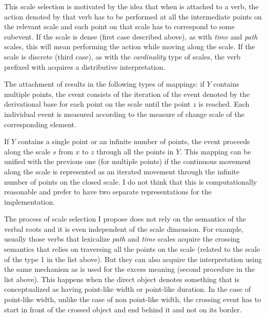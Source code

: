 
This scale selection is motivated by the idea that when  is attached to a verb, the action denoted by that verb has to be performed at all the intermediate points on the relevant scale and each point on that scale has to correspond to some subevent. If the scale is dense (first case described above), as with \textit{time} and \textit{path} scales, this will mean performing the action while moving along the scale. If the scale is discrete (third case), as with the \textit{cardinality} type of scales, the verb prefixed with  acquires a distributive interpretation. 

The attachment of  results in the following types of mappings: %
if $Y$ contains multiple points, the event consists of the iteration of the event denoted by the derivational base for each point on the scale until the point $z$ is reached. Each individual event is measured according to the measure of change scale of the corresponding element.

If $Y$ contains a single point or an infinite number of points, the event proceeds along the scale $s$ from $x$ to $z$ through all the points in $Y$. This mapping can be unified with the previous one (for multiple points) if the continuous movement along the scale is represented as an iterated movement through the infinite number of points on the closed scale. I do not think that this is computationally reasonable and prefer to have two separate representations for the implementation.

The process of scale selection I propose does not rely on the semantics of the verbal roots and it is even independent of the scale dimension. For example, usually those verbs that lexicalize \textit{path} and \textit{time} scales acquire the crossing semantics that relies on traversing all the points on the scale (related to the scale of the type 1 in the list above). But they can also acquire the interpretation using the same mechanism as is used for the excess meaning (second procedure in the list above). This happens when the direct object denotes something that is conceptualized as having point-like width or point-like duration. In the case of point-like width, unlike the case of non point-like width, the crossing event has to start in front of the crossed object and end behind it and not on its border.

